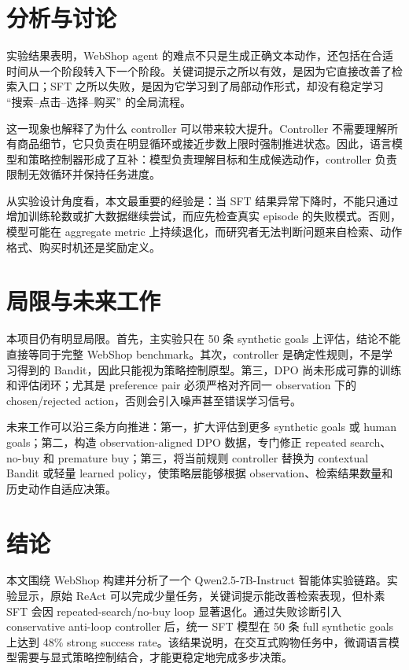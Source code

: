 \documentclass[11pt]{article}
\begin{document}
\section{分析与讨论}

实验结果表明，WebShop agent 的难点不只是生成正确文本动作，还包括在合适时间从一个阶段转入下一个阶段。关键词提示之所以有效，是因为它直接改善了检索入口；SFT 之所以失败，是因为它学习到了局部动作形式，却没有稳定学习 ``搜索--点击--选择--购买'' 的全局流程。

这一现象也解释了为什么 controller 可以带来较大提升。Controller 不需要理解所有商品细节，它只负责在明显循环或接近步数上限时强制推进状态。因此，语言模型和策略控制器形成了互补：模型负责理解目标和生成候选动作，controller 负责限制无效循环并保持任务进度。

从实验设计角度看，本文最重要的经验是：当 SFT 结果异常下降时，不能只通过增加训练轮数或扩大数据继续尝试，而应先检查真实 episode 的失败模式。否则，模型可能在 aggregate metric 上持续退化，而研究者无法判断问题来自检索、动作格式、购买时机还是奖励定义。

\section{局限与未来工作}

本项目仍有明显局限。首先，主实验只在 50 条 synthetic goals 上评估，结论不能直接等同于完整 WebShop benchmark。其次，controller 是确定性规则，不是学习得到的 Bandit，因此只能视为策略控制原型。第三，DPO 尚未形成可靠的训练和评估闭环；尤其是 preference pair 必须严格对齐同一 observation 下的 chosen/rejected action，否则会引入噪声甚至错误学习信号。

未来工作可以沿三条方向推进：第一，扩大评估到更多 synthetic goals 或 human goals；第二，构造 observation-aligned DPO 数据，专门修正 repeated search、no-buy 和 premature buy；第三，将当前规则 controller 替换为 contextual Bandit 或轻量 learned policy，使策略层能够根据 observation、检索结果数量和历史动作自适应决策。

\section{结论}

本文围绕 WebShop 构建并分析了一个 Qwen2.5-7B-Instruct 智能体实验链路。实验显示，原始 ReAct 可以完成少量任务，关键词提示能改善检索表现，但朴素 SFT 会因 repeated-search/no-buy loop 显著退化。通过失败诊断引入 conservative anti-loop controller 后，统一 SFT 模型在 50 条 full synthetic goals 上达到 48\% strong success rate。该结果说明，在交互式购物任务中，微调语言模型需要与显式策略控制结合，才能更稳定地完成多步决策。
\end{document}
